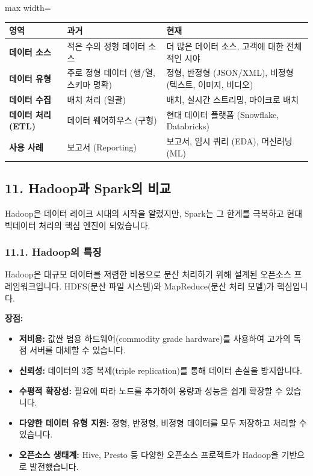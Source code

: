 \documentclass[11pt,a4paper]{article}
\theoremstyle{definition}
\begin{document}
\begin{adjustbox}{max width=\textwidth}
\begin{tabular}{lll}
\toprule
\textbf{영역} & \textbf{과거} & \textbf{현재} \\
\midrule
\textbf{데이터 소스} & 적은 수의 정형 데이터 소스 & 더 많은 데이터 소스, 고객에 대한 전체적인 시야 \\
\textbf{데이터 유형} & 주로 정형 데이터 (행/열, 스키마 명확) & 정형, 반정형 (JSON/XML), 비정형 (텍스트, 이미지, 비디오) \\
\textbf{데이터 수집} & 배치 처리 (일괄) & 배치, 실시간 스트리밍, 마이크로 배치 \\
\textbf{데이터 처리 (ETL)} & 데이터 웨어하우스 (구형) & 현대 데이터 플랫폼 (Snowflake, Databricks) \\
\textbf{사용 사례} & 보고서 (Reporting) & 보고서, 임시 쿼리 (EDA), 머신러닝 (ML) \\
\bottomrule
\end{tabular}
\end{adjustbox}

\subsection*{11. Hadoop과 Spark의 비교}

Hadoop은 데이터 레이크 시대의 시작을 알렸지만, Spark는 그 한계를 극복하고 현대 빅데이터 처리의 핵심 엔진이 되었습니다.

\subsubsection*{11.1. Hadoop의 특징}

\begin{summarybox}
Hadoop은 대규모 데이터를 저렴한 비용으로 분산 처리하기 위해 설계된 오픈소스 프레임워크입니다. HDFS(분산 파일 시스템)와 MapReduce(분산 처리 모델)가 핵심입니다.
\end{summarybox}

\textbf{장점:}
\begin{itemize}
    \item \textbf{저비용:} 값싼 범용 하드웨어(commodity grade hardware)를 사용하여 고가의 독점 서버를 대체할 수 있습니다.
    \item \textbf{신뢰성:} 데이터의 3중 복제(triple replication)를 통해 데이터 손실을 방지합니다.
    \item \textbf{수평적 확장성:} 필요에 따라 노드를 추가하여 용량과 성능을 쉽게 확장할 수 있습니다.
    \item \textbf{다양한 데이터 유형 지원:} 정형, 반정형, 비정형 데이터를 모두 저장하고 처리할 수 있습니다.
    \item \textbf{오픈소스 생태계:} Hive, Presto 등 다양한 오픈소스 프로젝트가 Hadoop을 기반으로 발전했습니다.
\end{itemize}
\end{document}
